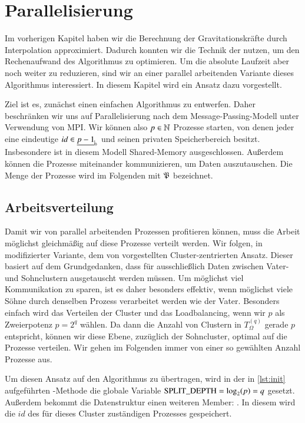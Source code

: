 \section{Parallelisierung}
\label{sec:parallelpart}
  Im vorherigen Kapitel haben wir die Berechnung der Gravitationskräfte durch Interpolation approximiert. Dadurch konnten wir die Technik der \hquad nutzen, um den Rechenaufwand des Algorithmus zu 
  optimieren.
  Um die absolute Laufzeit aber noch weiter zu reduzieren, sind wir an einer parallel arbeitenden Variante dieses Algorithmus interessiert. In diesem Kapitel wird ein Ansatz dazu vorgestellt.
  
  Ziel ist es, zunächst einen einfachen Algorithmus zu entwerfen. Daher beschränken wir uns auf Parallelisierung nach dem Message-Passing-Modell unter Verwendung von MPI. Wir können also 
  $p \in \mathbb{N}$ Prozesse starten, von denen jeder eine eindeutige $id \in \nullhaken{p-1}$ und seinen privaten Speicherbereich besitzt. Insbesondere ist in diesem Modell Shared-Memory ausgeschlossen. 
  Außerdem können die Prozesse miteinander kommunizieren, um Daten auszutauschen. Die Menge der Prozesse wird im Folgenden mit $\mathfrak{P}$ bezeichnet.

  
  \subsection{Arbeitsverteilung}
  \label{sec:work}
    Damit wir von parallel arbeitenden Prozessen profitieren können, muss die Arbeit möglichst gleichmäßig auf diese Prozesse verteilt werden. Wir folgen, in modifizierter Variante, dem von 
    \citet{distrh2} vorgestellten Cluster-zentrierten Ansatz. 
    Dieser basiert auf dem Grundgedanken, dass für \vorruck ausschließlich Daten zwischen Vater- und Sohnclustern ausgetauscht werden müssen. Um möglichst viel Kommunikation zu sparen, ist es daher
    besonders effektiv, wenn möglichst viele Söhne durch denselben Prozess verarbeitet werden wie der Vater. Besonders einfach wird das Verteilen der Cluster und das Loadbalancing, wenn wir $p$ als 
    Zweierpotenz $p = 2^q$ wählen. Da dann die Anzahl von Clustern in $T_\Omega^{(q)}$ gerade $p$ entspricht, können wir diese Ebene, zuzüglich der Sohncluster, optimal auf die Prozesse verteilen.
    Wir gehen im Folgenden immer von einer so gewählten Anzahl Prozesse aus.
    
    Um diesen Ansatz auf den Algorithmus zu übertragen, wird in der in \autoref{lst:init} aufgeführten -Methode die globale Variable $\tcode{SPLIT_DEPTH} = \log_2(p) = q$ gesetzt. 
    Außerdem bekommt die Datenstruktur  einen weiteren Member: . In diesem  wird die $id$ des für dieses Cluster zuständigen Prozesses gespeichert.
    
